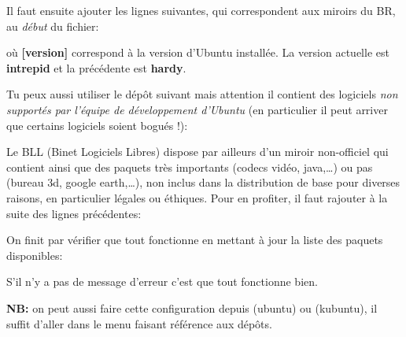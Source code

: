 
Il faut ensuite ajouter les lignes suivantes, qui correspondent aux miroirs du BR, au \emph{d\'ebut} du fichier:


o\`u \textbf{[version]} correspond \`a la version d'Ubuntu install\'ee. La version actuelle est \textbf{intrepid} et la pr\'ec\'edente est \textbf{hardy}.

Tu peux aussi utiliser le d\'ep\^ot suivant mais attention il contient des logiciels \emph{non support\'es par l'\'equipe de d\'eveloppement d'Ubuntu} (en particulier il peut arriver que certains logiciels soient bogu\'es !):


Le BLL (Binet Logiciels Libres) dispose par ailleurs d'un miroir non-officiel qui contient  ainsi que des paquets tr\`es importants (codecs
vid\'eo, java,\dots) ou pas (bureau 3d, google earth,\dots), non inclus dans la distribution de base pour diverses raisons, en particulier l\'egales ou
\'ethiques. Pour en profiter, il faut rajouter \`a la suite des lignes pr\'ec\'edentes:



On finit par v\'erifier que tout fonctionne en mettant \`a jour la liste
des paquets disponibles:


S'il n'y a pas de message d'erreur c'est que tout fonctionne bien.

\textbf{NB:} on peut aussi faire cette configuration depuis  (ubuntu) ou  (kubuntu), il suffit d'aller dans le menu faisant r\'ef\'erence aux d\'ep\^ots.

